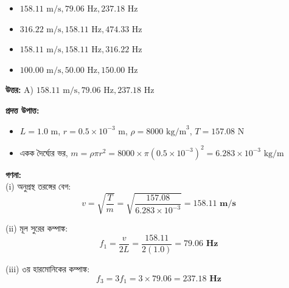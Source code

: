 \documentclass[12pt, a4paper]{article}
\begin{document}
\begin{itemize}[label={}, leftmargin=1cm, itemsep=0.5em]
    \item[\textbf{A)}] $158.11\text{ m/s}, 79.06\text{ Hz}, 237.18\text{ Hz}$
    \item[\textbf{B)}] $316.22\text{ m/s}, 158.11\text{ Hz}, 474.33\text{ Hz}$
    \item[\textbf{C)}] $158.11\text{ m/s}, 158.11\text{ Hz}, 316.22\text{ Hz}$
    \item[\textbf{D)}] $100.00\text{ m/s}, 50.00\text{ Hz}, 150.00\text{ Hz}$
\end{itemize}

\vspace{0.5em}
\begin{tcolorbox}[answerbox]
    \textbf{\color{success} উত্তর:} A) $158.11\text{ m/s}, 79.06\text{ Hz}, 237.18\text{ Hz}$
\end{tcolorbox}
\vspace{1em}

\begin{tcolorbox}[solutionbox={সমাধান (Solution)}]
    \noindent
    \textbf{প্রদত্ত উপাত্ত:}
    \begin{itemize}[leftmargin=1.5em, itemsep=0.2em]
        \item $L = 1.0\text{ m}$, $r = 0.5 \times 10^{-3}\text{ m}$, $\rho = 8000\text{ kg/m}^3$, $T = 157.08\text{ N}$
        \item একক দৈর্ঘ্যের ভর, $m = \rho \pi r^2 = 8000 \times \pi (0.5 \times 10^{-3})^2 = 6.283 \times 10^{-3}\text{ kg/m}$
    \end{itemize}

    \vspace{0.6em}
    \noindent\textbf{গণনা:} \\
    (i) অনুপ্রস্থ তরঙ্গের বেগ:
    \[ v = \sqrt{\frac{T}{m}} = \sqrt{\frac{157.08}{6.283 \times 10^{-3}}} = \mathbf{158.11\text{ m/s}} \]
    
    (ii) মূল সুরের কম্পাঙ্ক:
    \[ f_1 = \frac{v}{2L} = \frac{158.11}{2(1.0)} = \mathbf{79.06\text{ Hz}} \]
    
    (iii) ৩য় হারমোনিকের কম্পাঙ্ক:
    \[ f_3 = 3 f_1 = 3 \times 79.06 = \mathbf{237.18\text{ Hz}} \]
\end{tcolorbox}
\end{document}
